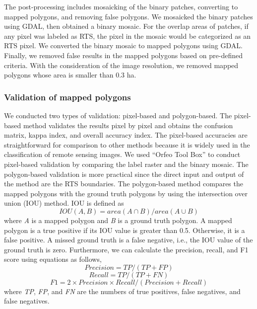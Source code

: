 \documentclass[preprint,12pt,authoryear]{elsarticle}
\begin{document}
The post-processing includes mosaicking of the binary patches, converting to mapped polygons, and removing false polygons. We mosaicked the binary patches using GDAL, then obtained a binary mosaic. For the overlap areas of patches, if any pixel was labeled as RTS, the pixel in the mosaic would be categorized as an RTS pixel. We converted the binary mosaic to mapped polygons using GDAL. Finally, we removed false results in the mapped polygons based on pre-defined criteria. With the consideration of the image resolution, we removed mapped polygons whose area is smaller than 0.3 ha.  

\subsubsection{Validation of mapped polygons}
\label{subsubsec_validation}

We conducted two types of validation: pixel-based and polygon-based. The pixel-based method validates the results pixel by pixel and obtains the confusion matrix, kappa index, and overall accuracy index. The pixel-based accuracies are straightforward for comparison to other methods because it is widely used in the classification of remote sensing images. We used ``Orfeo Tool Box'' \citep{inglada2009orfeo} to conduct pixel-based validation by comparing the label raster and the binary mosaic. The polygon-based validation is more practical since the direct input and output of the method are the RTS boundaries. The polygon-based method compares the mapped polygons with the ground truth polygons by using the intersection over union (IOU) method.  IOU is defined as 
\begin{equation}
IOU(A,B)=area(A \cap B)/area(A \cup B)
\label{equ_iou}
\end{equation}
where \emph{A} is a mapped polygon and \emph{B} is a ground truth polygon. A mapped polygon is a true positive if its IOU value is greater than 0.5. Otherwise, it is a false positive. A missed ground truth is a false negative, i.e., the IOU value of the ground truth is zero. Furthermore, we can calculate the precision, recall, and F1 score using equations as follows,
\begin{equation}
Precision=TP/(TP+FP)
\label{equ_precision}
\end{equation}
\begin{equation}
Recall=TP/(TP+FN)
\label{equ_recall}
\end{equation}
\begin{equation}
F1=2 \times Precision \times Recall / (Precision + Recall)
\label{equ_f1score}
\end{equation}
where \emph{TP}, \emph{FP}, and \emph{FN} are the numbers of true positives, false negatives, and false negatives. 
\end{document}
